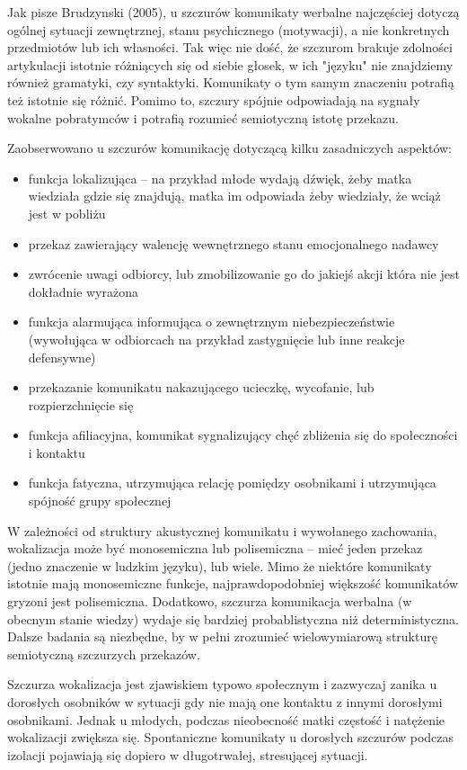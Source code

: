 \documentclass{psychol}
\begin{document}
Jak pisze Brudzynski (2005), u szczurów komunikaty werbalne najczęściej dotyczą ogólnej sytuacji zewnętrznej, stanu psychicznego (motywacji), a nie konkretnych przedmiotów lub ich własności. Tak więc nie dość, że szczurom brakuje zdolności artykulacji istotnie różniących się od siebie głosek, w ich "języku" nie znajdziemy również gramatyki, czy syntaktyki. Komunikaty o tym samym znaczeniu potrafią też istotnie się różnić. Pomimo to, szczury spójnie odpowiadają na sygnały wokalne pobratymców i potrafią rozumieć semiotyczną istotę przekazu.

Zaobserwowano u szczurów komunikację dotyczącą kilku zasadniczych aspektów:
\begin{itemize}
    \item funkcja lokalizująca -- na przykład młode wydają dźwięk, żeby matka wiedziała gdzie się znajdują, matka im odpowiada żeby wiedziały, że wciąż jest w pobliżu
    \item przekaz zawierający walencję wewnętrznego stanu emocjonalnego nadawcy
    \item zwrócenie uwagi odbiorcy, lub zmobilizowanie go do jakiejś akcji która nie jest dokładnie wyrażona
    \item funkcja alarmująca informująca o zewnętrznym niebezpieczeństwie (wywołująca w odbiorcach na przykład zastygnięcie lub inne reakcje defensywne)
    \item przekazanie komunikatu nakazującego ucieczkę, wycofanie, lub rozpierzchnięcie się
    \item funkcja afiliacyjna, komunikat sygnalizujący chęć zbliżenia się do społeczności i kontaktu
    \item funkcja fatyczna, utrzymująca relację pomiędzy osobnikami i utrzymująca spójność grupy społecznej
\end{itemize}

W zależności od struktury akustycznej komunikatu i wywołanego zachowania, wokalizacja może być monosemiczna lub polisemiczna -- mieć jeden przekaz (jedno znaczenie w ludzkim języku), lub wiele. Mimo że niektóre komunikaty istotnie mają monosemiczne funkcje, najprawdopodobniej większość komunikatów gryzoni jest polisemiczna. Dodatkowo, szczurza komunikacja werbalna (w obecnym stanie wiedzy) wydaje się bardziej probablistyczna niż deterministyczna. Dalsze badania są niezbędne, by w pełni zrozumieć wielowymiarową strukturę semiotyczną szczurzych przekazów.

Szczurza wokalizacja jest zjawiskiem typowo społecznym i zazwyczaj zanika u dorosłych osobników w sytuacji gdy nie mają one kontaktu z innymi dorosłymi osobnikami. Jednak u młodych, podczas nieobecność matki częstość i natężenie wokalizacji zwiększa się. Spontaniczne komunikaty u dorosłych szczurów podczas izolacji pojawiają się dopiero w długotrwałej, stresującej sytuacji.
\end{document}
